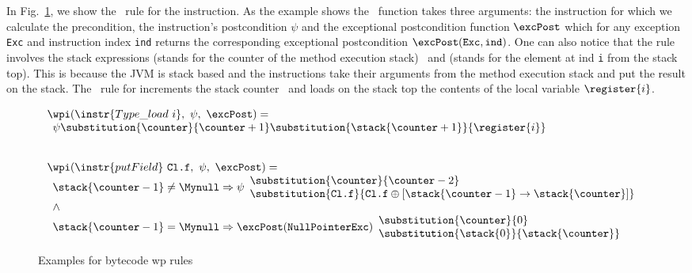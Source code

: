  In Fig.~\ref{instrWP}, we show the \wpi \ rule for the  instruction.
 As the example shows the \wpi \ function takes three arguments:
the instruction for which we calculate the precondition, 
the instruction's postcondition $\psi$ and the exceptional postcondition function $\excPost$ which for any exception \texttt{Exc} and 
instruction index \texttt{ind} returns the
corresponding exceptional postcondition $\excPost(\texttt{Exc}, \tt{ind})$. One can also notice that the rule involves the stack expressions \counter 
(stands for the counter of the method execution stack) \ and  (stands for the element at ind \texttt{i} from the stack top).
 This is because the JVM is stack based and the instructions take their arguments from the method execution stack and 
 put the result on the stack.
 The \wpi \ rule for   increments the stack counter \counter \ and loads on the stack top the contents
 of the local variable $\register{i}$. 




\begin{figure}[ht]
\[
\begin{array}{l}
\wpi(\instr{Type\_load \ i}, \ \psi, \ \excPost)  = \\
\begin{array}{l}  \psi\substitution{\counter }{\counter+1} \substitution{\stack{\counter+1}}{\register{i}} \end{array} \\
\\
\\
 \wpi(\instr{putField} \ \texttt{Cl.f}, \ \psi, \ \excPost)  = \\
\begin{array}{l}
                \stack{\counter -1} \not= \Mynull\Rightarrow   
         \psi\begin{array}{l} \substitution{\counter}{ \counter-2 } \\[0 mm] 
                           \substitution{\texttt{Cl.f} }{ \texttt{Cl.f}\oplus [\stack{\counter -1} \rightarrow \stack{\counter}] } \\
                \end{array}\\

   \wedge \\
        \stack{\counter-1} = \Mynull    \Rightarrow \excPost(\tt{NullPointerExc})
        \begin{array}{l}
          \substitution{ \counter }{ 0} \\
          \substitution{\stack{0}}{ \stack{\counter}} 
        \end{array}
    \end{array} %
\end{array}
 \]       
\caption{\sc Examples for bytecode wp rules}
 \label{instrWP}

\end{figure}

